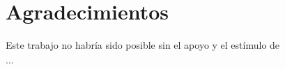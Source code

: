 \chapter*{Agradecimientos}
Este trabajo no habría sido posible sin el apoyo y el estímulo de

 $\dots$ \blindtext %
